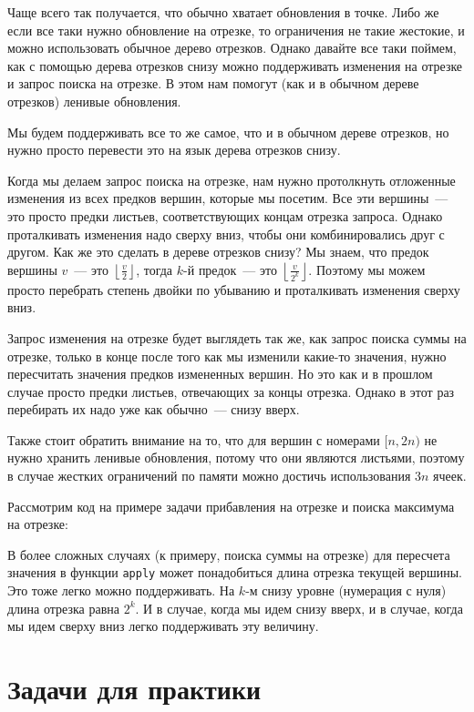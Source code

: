 Чаще всего так получается, что обычно хватает обновления в точке. Либо же если все таки нужно обновление на отрезке, то ограничения не такие жестокие, и можно использовать обычное дерево отрезков. Однако давайте все таки поймем, как с помощью дерева отрезков снизу можно поддерживать изменения на отрезке и запрос поиска на отрезке. В этом нам помогут (как и в обычном дереве отрезков) ленивые обновления.

Мы будем поддерживать все то же самое, что и в обычном дереве отрезков, но нужно просто перевести это на язык дерева отрезков снизу.

Когда мы делаем запрос поиска на отрезке, нам нужно протолкнуть отложенные изменения из всех предков вершин, которые мы посетим. Все эти вершины~--- это просто предки листьев, соответствующих концам отрезка запроса. Однако проталкивать изменения надо сверху вниз, чтобы они комбинировались друг с другом. Как же это сделать в дереве отрезков снизу? Мы знаем, что предок вершины $v$~--- это $\left\lfloor \frac{v}{2} \right\rfloor$, тогда $k$-й предок~--- это $\left\lfloor \frac{v}{2^k} \right\rfloor$. Поэтому мы можем просто перебрать степень двойки по убыванию и проталкивать изменения сверху вниз.

Запрос изменения на отрезке будет выглядеть так же, как запрос поиска суммы на отрезке, только в конце после того как мы изменили какие-то значения, нужно пересчитать значения предков измененных вершин. Но это как и в прошлом случае просто предки листьев, отвечающих за концы отрезка. Однако в этот раз перебирать их надо уже как обычно~--- снизу вверх.

Также стоит обратить внимание на то, что для вершин с номерами $[n, 2n)$ не нужно хранить ленивые обновления, потому что они являются листьями, поэтому в случае жестких ограничений по памяти можно достичь использования $3n$ ячеек.

Рассмотрим код на примере задачи прибавления на отрезке и поиска максимума на отрезке:



В более сложных случаях (к примеру, поиска суммы на отрезке) для пересчета значения в функции \verb+apply+ может понадобиться длина отрезка текущей вершины. Это тоже легко можно поддерживать. На $k$-м снизу уровне (нумерация с нуля) длина отрезка равна $2^k$. И в случае, когда мы идем снизу вверх, и в случае, когда мы идем сверху вниз легко поддерживать эту величину.

\section{Задачи для практики}

